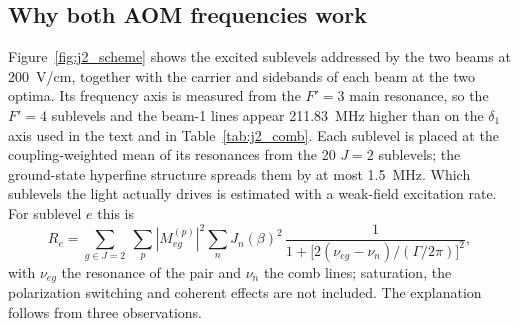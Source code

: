\documentclass[11pt,a4paper,oneside]{report}
\begin{document}
\subsection{Why both AOM frequencies work}
\label{sec:j2_two_aom}

Figure~\ref{fig:j2_scheme} shows the excited sublevels addressed by the two beams at
\SI{200}{V/cm}, together with the carrier and sidebands of each beam at the two optima. Its
frequency axis is measured from the $F'=3$ main resonance, so the $F'=4$ sublevels and the
beam-1 lines appear \SI{211.83}{MHz} higher than on the $\delta_1$ axis used in the text and in
Table~\ref{tab:j2_comb}. Each sublevel is placed at the coupling-weighted mean of its
resonances from the 20 $J=2$ sublevels; the ground-state hyperfine structure spreads them by at
most \SI{1.5}{MHz}. Which sublevels the light actually drives is estimated with a weak-field
excitation rate. For sublevel $e$ this is
\begin{equation}
  R_e=\sum_{g\in J=2}\ \sum_{p}|M^{(p)}_{eg}|^2\sum_n J_n(\beta)^2\,
  \frac{1}{1+\bigl[2(\nu_{eg}-\nu_n)/(\Gamma/2\pi)\bigr]^2},
  \label{eq:rate}
\end{equation}
with $\nu_{eg}$ the resonance of the pair and $\nu_n$ the comb lines; saturation, the
polarization switching and coherent effects are not included. The explanation follows from three
observations.
\end{document}
